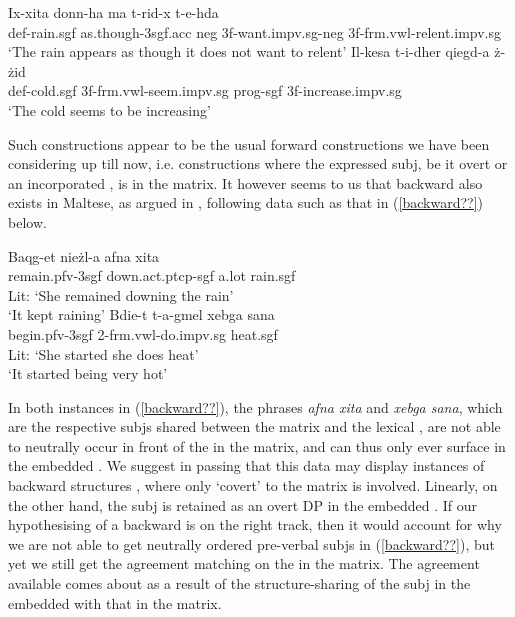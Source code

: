 \documentclass[output=paper]{LSP/langsci}
\begin{document}
\ea \label{metsubj}
\ea \label{nolexpredsubj}
\gll Ix-xita donn-ha ma t-rid-x t-e-hda\\
{\sc def-}rain.{\sc sgf} as.though-{\sc 3sgf.acc} {\sc neg} 3{\sc f}-want.{\sc impv.sg-neg} 3{\sc f}-{\sc frm.vwl}-relent.{\sc impv.sg}\\
\glt `The rain appears as though it does not want to relent' 
\ex \label{nolightsubj}
\gll Il-kes\textcrh a t-i-dher qieg\textcrh d-a {\.z}-{\.z}id\\
{\sc def-}cold.{\sc sgf} 3{\sc f}-{\sc frm.vwl}-seem.{\sc impv.sg} {\sc prog-sgf} 3{\sc f}-increase.{\sc impv.sg}\\
\glt `The cold seems to be increasing'
\z
\z

Such constructions appear to be the usual forward  constructions we have been considering up till now, i.e.  constructions where the expressed {\sc subj}, be it overt or an incorporated , is in the matrix. It however seems to us that backward  also exists in Maltese, as argued in \citet[292]{Camilleri16}, following data such as that in (\ref{backward??}) below. 

\ea \label{backward??}
\ea \label{lexpredsubj}
\gll Baqg\textcrh-et nie{\.z}l-a \textcrh afna xita\\
remain.{\sc pfv-3sgf} down.{\sc act.ptcp-sgf} a.lot rain.{\sc sgf}\\
\glt Lit: `She remained downing the rain'\\
\glt `It kept raining' 
\ex \label{lightsubj}
\gll Bdie-t t-a-g\textcrh mel xebg\textcrh a s\textcrh ana\\
begin.{\sc pfv-3sgf} 2-{\sc frm.vwl}-do.{\sc impv.sg}  heat.{\sc sgf}\\
\glt Lit: `She started she does  heat'\\
\glt `It started being very hot' \hfill{\citep[19]{Alotaibi2013}}
\z
\z

In both instances in (\ref{backward??}), the phrases \emph{\textcrh afna xita} and \emph{xebg\textcrh a s\textcrh ana}, which are the respective {\sc subj}s shared between the matrix  and the lexical , are not able to neutrally occur in front of the  in the matrix, and can thus only ever surface in the embedded . 
We suggest in passing that this data may display instances of backward  structures \citep{PotsdamPolin2012}, where %
only `covert'  to the matrix is
involved. Linearly, on the other hand, the {\sc subj} is retained as an overt DP in the embedded . If our hypothesising of a backward  is on the right track, then it would account for why we are not able to get neutrally ordered pre-verbal {\sc subj}s in (\ref{backward??}), but yet we still get the agreement matching on the  in the matrix. The agreement available comes about as a result of the structure-sharing of the {\sc subj} in the embedded  with that in the matrix. 
\end{document}
